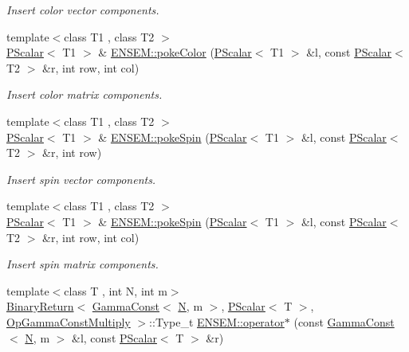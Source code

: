 \begin{DoxyCompactItemize}
\begin{DoxyCompactList}\small\item\em Insert color vector components. \end{DoxyCompactList}\item 
{\footnotesize template$<$class T1 , class T2 $>$ }\\\mbox{\hyperlink{classENSEM_1_1PScalar}{P\+Scalar}}$<$ T1 $>$ \& \mbox{\hyperlink{group__primscalar_ga540606e7a9a4e2fbb97da4a95bc1c21f}{E\+N\+S\+E\+M\+::poke\+Color}} (\mbox{\hyperlink{classENSEM_1_1PScalar}{P\+Scalar}}$<$ T1 $>$ \&l, const \mbox{\hyperlink{classENSEM_1_1PScalar}{P\+Scalar}}$<$ T2 $>$ \&r, int row, int col)
\begin{DoxyCompactList}\small\item\em Insert color matrix components. \end{DoxyCompactList}\item 
{\footnotesize template$<$class T1 , class T2 $>$ }\\\mbox{\hyperlink{classENSEM_1_1PScalar}{P\+Scalar}}$<$ T1 $>$ \& \mbox{\hyperlink{group__primscalar_gaef0821cb16093e96134a98e5a765c45a}{E\+N\+S\+E\+M\+::poke\+Spin}} (\mbox{\hyperlink{classENSEM_1_1PScalar}{P\+Scalar}}$<$ T1 $>$ \&l, const \mbox{\hyperlink{classENSEM_1_1PScalar}{P\+Scalar}}$<$ T2 $>$ \&r, int row)
\begin{DoxyCompactList}\small\item\em Insert spin vector components. \end{DoxyCompactList}\item 
{\footnotesize template$<$class T1 , class T2 $>$ }\\\mbox{\hyperlink{classENSEM_1_1PScalar}{P\+Scalar}}$<$ T1 $>$ \& \mbox{\hyperlink{group__primscalar_gafc9650865b3cf15e32d79e07d1c01eff}{E\+N\+S\+E\+M\+::poke\+Spin}} (\mbox{\hyperlink{classENSEM_1_1PScalar}{P\+Scalar}}$<$ T1 $>$ \&l, const \mbox{\hyperlink{classENSEM_1_1PScalar}{P\+Scalar}}$<$ T2 $>$ \&r, int row, int col)
\begin{DoxyCompactList}\small\item\em Insert spin matrix components. \end{DoxyCompactList}\item 
{\footnotesize template$<$class T , int N, int m$>$ }\\\mbox{\hyperlink{structENSEM_1_1BinaryReturn}{Binary\+Return}}$<$ \mbox{\hyperlink{classENSEM_1_1GammaConst}{Gamma\+Const}}$<$ \mbox{\hyperlink{operator__name__util_8cc_a7722c8ecbb62d99aee7ce68b1752f337}{N}}, m $>$, \mbox{\hyperlink{classENSEM_1_1PScalar}{P\+Scalar}}$<$ T $>$, \mbox{\hyperlink{structENSEM_1_1OpGammaConstMultiply}{Op\+Gamma\+Const\+Multiply}} $>$\+::Type\+\_\+t \mbox{\hyperlink{group__primscalar_gaa4466bc56a8afcb00e7d7e37cc22d441}{E\+N\+S\+E\+M\+::operator$\ast$}} (const \mbox{\hyperlink{classENSEM_1_1GammaConst}{Gamma\+Const}}$<$ \mbox{\hyperlink{operator__name__util_8cc_a7722c8ecbb62d99aee7ce68b1752f337}{N}}, m $>$ \&l, const \mbox{\hyperlink{classENSEM_1_1PScalar}{P\+Scalar}}$<$ T $>$ \&r)

\end{DoxyCompactItemize}
